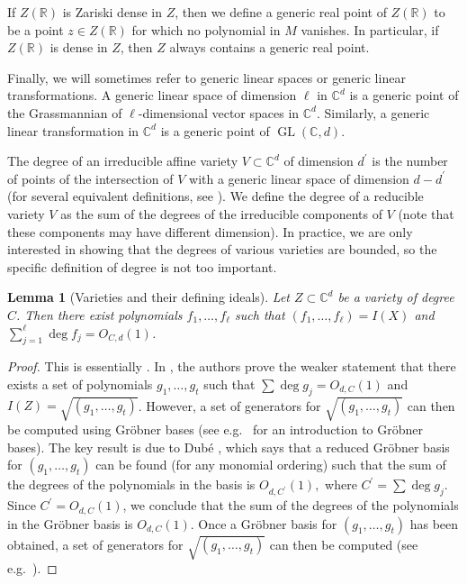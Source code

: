 \documentclass[letterpaper, reqno,11pt]{article}
\newtheorem{lemma}[theorem]{Lemma}
\theoremstyle{remark}
\newcommand{\RR}{\mathbb{R}}
\newcommand{\CC}{\mathbb{C}}
\begin{document}
If $Z(\RR)$ is Zariski dense in $Z$, then we define a generic real point of $Z(\RR)$ to be a point $z\in Z(\RR)$ for which no polynomial in $M$ vanishes. In particular, if $Z(\RR)$ is dense in $Z$, then $Z$ always contains a generic real point.

Finally, we will sometimes refer to generic linear spaces or generic linear transformations. A generic linear space of dimension $\ell$ in $\CC^d$ is a generic point of the Grassmannian of $\ell$-dimensional vector spaces in $\CC^d$. Similarly, a generic linear transformation in $\CC^d$ is a generic point of $\operatorname{GL}(\CC,d)$.

The degree of an irreducible affine variety $V \subset\CC^d$ of dimension $d^\prime$ is the number of points of the intersection of $V$ with a generic linear space of dimension $d-d^\prime$ (for several equivalent definitions, see \cite[Chapter 18]{Harris}).
We define the degree of a reducible variety $V$ as the sum of the degrees of the irreducible components of $V$ (note that these components may have different dimension). In practice, we are only interested in showing that the degrees of various varieties are bounded, so the specific definition of degree is not too important.

\begin{lemma}[Varieties and their defining ideals]\label{varDefIdeal}
Let $Z\subset\CC^d$ be a variety of degree $C$.
Then there exist polynomials $f_1,\ldots,f_{\ell}$ such that $(f_1,\ldots,f_{\ell})=I(X)$ and $\sum_{j=1}^{\ell} \deg f_j = O_{C,d}(1)$.
\end{lemma}
\begin{proof}
This is essentially \cite[Theorem A.3]{BGT}. In \cite{BGT}, the authors prove the weaker statement that there exists a set of polynomials $g_1,\ldots,g_t$ such that $\sum\deg g_j = O_{d,C}(1)$ and $I(Z) = \sqrt{(g_1,\ldots,g_t)}$. However, a set of generators for $\sqrt{(g_1,\ldots,g_t)}$ can then be computed using Gr\"obner bases (see e.g.~\cite{CLS} for an introduction to Gr\"obner bases). The key result is due to Dub\'e \cite{dube}, which says that a reduced Gr\"obner basis for $(g_1,\ldots,g_t)$ can be found (for any monomial ordering) such that the sum of the degrees of the polynomials in the basis is $O_{d,C^\prime}(1),$ where $C^\prime= \sum\deg g_j$. Since $C^\prime=O_{d,C}(1)$, we conclude that the sum of the degrees of the polynomials in the Gr\"obner basis is $O_{d,C}(1)$. Once a Gr\"obner basis for $(g_1,\ldots,g_t)$ has been obtained, a set of generators for $\sqrt{(g_1,\ldots,g_t)}$ can then be computed (see e.g.~\cite[Section 9]{GTZ}).
\end{proof}
\end{document}
